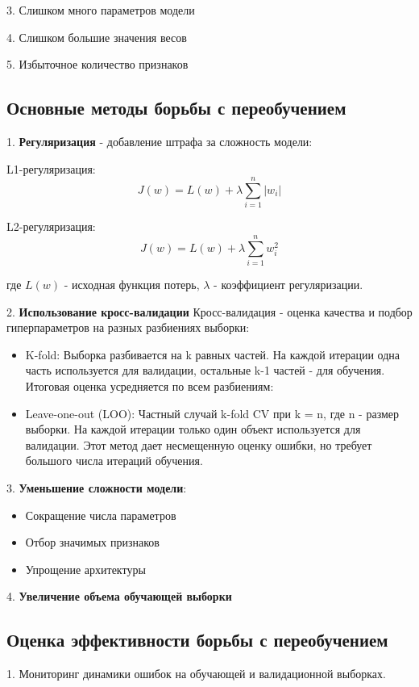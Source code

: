 3. Слишком много параметров модели

4. Слишком большие значения весов

5. Избыточное количество признаков

\subsection*{Основные методы борьбы с переобучением}

1. \textbf{Регуляризация} - добавление штрафа за сложность модели:

L1-регуляризация:
\[J(w) = L(w) + \lambda\sum_{i=1}^n |w_i|\]

L2-регуляризация:
\[J(w) = L(w) + \lambda\sum_{i=1}^n w_i^2\]

где $L(w)$ - исходная функция потерь, $\lambda$ - коэффициент регуляризации.

2. \textbf{Использование кросс-валидации}
Кросс-валидация - оценка качества и подбор гиперпараметров на разных разбиениях выборки:
  \begin{itemize}
     \item K-fold: Выборка разбивается на k равных частей. На каждой итерации одна часть используется для валидации, остальные k-1 частей - для обучения. Итоговая оценка усредняется по всем разбиениям:
     \item Leave-one-out (LOO): Частный случай k-fold CV при k = n, где n - размер выборки. На каждой итерации только один объект используется для валидации. Этот метод дает несмещенную оценку ошибки, но требует большого числа итераций обучения.
  \end{itemize}

3. \textbf{Уменьшение сложности модели}:
  \begin{itemize}
     \item Сокращение числа параметров
     \item Отбор значимых признаков
     \item Упрощение архитектуры
  \end{itemize}

4. \textbf{Увеличение объема обучающей выборки}

\subsection*{Оценка эффективности борьбы с переобучением}

1. Мониторинг динамики ошибок на обучающей и валидационной выборках.

